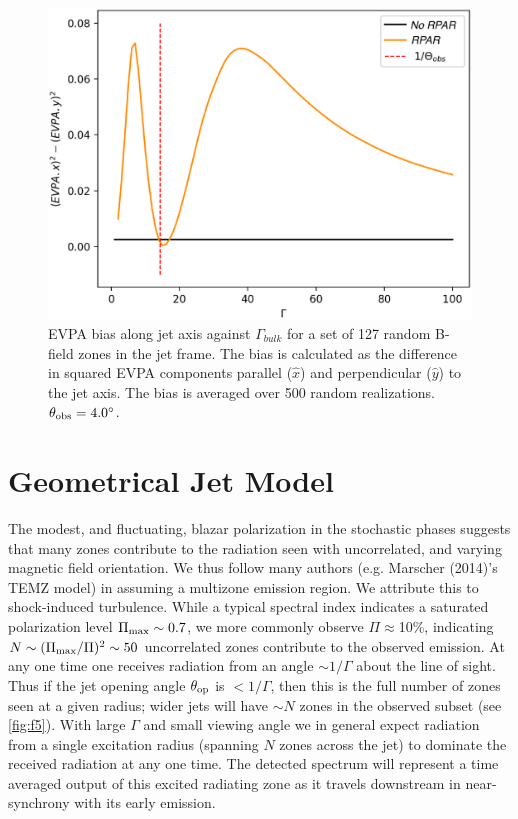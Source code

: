 \begin{figure}[t]
\label{fig:f4}
\includegraphics[width=0.8\linewidth]{figures/f4.eps}
\centering
\caption{EVPA bias along jet axis against $\Gamma_{bulk}$ for a set of 127 random B-field zones in the jet frame. The bias is calculated as the difference in squared EVPA components parallel ($\hat{x}$) and perpendicular ($\hat{y}$) to the jet axis. The bias is averaged over 500 random realizations. $\theta_{\rm obs} = 4.0^{\circ}$.}
\end{figure}

\section{Geometrical Jet Model}

The modest, and fluctuating, blazar polarization in the stochastic phases suggests that many zones contribute to the radiation seen with uncorrelated, and varying magnetic field orientation. We thus follow many authors (e.g. Marscher (2014)'s TEMZ model) in assuming a multizone emission region. We attribute this to shock-induced turbulence. While a typical spectral index indicates a saturated polarization level $\Pi_{\rm max} \sim 0.7$, we more commonly observe $\Pi \approx $10\%, indicating $N \sim (\Pi_{\rm max}/\Pi )^2 \sim 50$ uncorrelated zones contribute to the observed emission. At any one time one receives radiation from an angle $\sim 1/\Gamma$ about the line of sight. Thus if the jet opening angle $\theta_{\rm op}$ is $<1/\Gamma$, then this is the full number of zones seen at a given radius; wider jets will have $\sim N$ zones in the observed subset (see \cref{fig:f5}). With large $\Gamma$ and small viewing angle we in general expect radiation from a single excitation radius (spanning $N$ zones across the jet) to dominate the received radiation at any one time. The detected spectrum will represent a time averaged output of this excited radiating zone as it travels downstream in near-synchrony with its early emission. 

